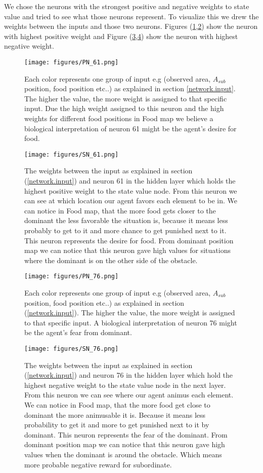 \documentclass{article}
\begin{document}
We chose the neurons with the strongest positive and negative weights to state value and tried to see what those neurons represent. To visualize this we drew the weights between the inputs and those two neurons. Figures (\ref{fig.PN_61},\ref{fig.SN_61}) show the neuron with highest positive weight and Figure (\ref{fig.PN_76},\ref{fig.SN_76}) show the neuron with highest negative weight.  


\begin{figure}[H]
\texttt{[image: figures/PN\_61.png]}
\caption{Each color represents one group of input e.g (observed area, \(A_{sub}\) position, food position etc..) as explained in section \ref{network.input}. The higher the value, the more weight is assigned to that specific input. Due the high weight assigned to this neuron and the high weights for different food positions in Food map we believe a biological interpretation of neuron 61 might be the agent's desire for food.}
\label{fig.PN_61}
\end{figure}
\begin{figure}[H]
\texttt{[image: figures/SN\_61.png]}
\caption{The weights between the input as explained in section (\ref{network.input}) and neuron 61 in the hidden layer which holds the highest positive weight to the state value node. From this neuron we can see at which location our agent favors each element to be in. We can notice in Food map, that the more food gets closer to the dominant the less favorable the situation is, because it means less probably to get to it and more chance to get punished next to it. This neuron represents the desire for food. From dominant position map we can notice that this neuron gave high values for situations where the dominant is on the other side of the obstacle.}
\label{fig.SN_61}
\end{figure}
\begin{figure}[H]
\texttt{[image: figures/PN\_76.png]}
\caption{Each color represents one group of input e.g (observed area, \(A_{sub}\) position, food position etc..) as explained in section (\ref{network.input}). The higher the value, the more weight is assigned to that specific input. A biological interpretation of neuron 76 might be the agent's fear from dominant.}
\label{fig.PN_76}
\end{figure}
\begin{figure}[H]
\texttt{[image: figures/SN\_76.png]}
\caption{The weights between the input as explained in section (\ref{network.input}) and neuron 76 in the hidden layer which hold the highest negative weight to the state value node in the next layer. From this neuron we can see where our agent animus each element. We can notice in Food map, that the more food get close to dominant the more  animusable it is. Because it means less probability to get it and more to get punished next to it by dominant. This neuron represents the fear of the dominant. From dominant position map we can notice that this neuron gave high values when the dominant is around the obstacle. Which means more probable negative reward for subordinate.}
\label{fig.SN_76}
\end{figure}
\end{document}
